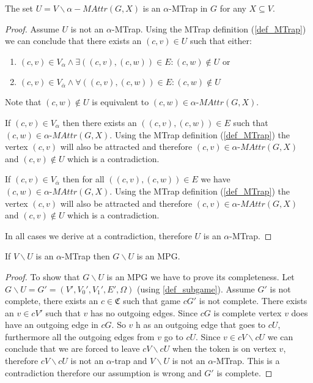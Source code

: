 \begin{lemma}
	\label{lem_MPG_attr_exc_trap}
	The set $U=V\backslash \alpha{-}MAttr(G,X)$ is an $\alpha$-MTrap in $G$ for any $X \subseteq V$.
	\begin{proof}
		Assume $U$ is not an $\alpha$-MTrap. Using the MTrap definition (\ref{def_MTrap}) we can conclude that there exists an $(c,v) \in U$ such that either:
		\begin{enumerate}
			\item $(c,v) \in V_\alpha \wedge \exists((c,v),(c,w)) \in E: (c,w) \notin U$ or
			\item $(c,v) \in V_{\overline{\alpha}} \wedge \forall((c,v),(c,w)) \in E: (c,w) \notin U$
		\end{enumerate}
	Note that $(c,w) \notin U$ is equivalent to $(c,w) \in \alpha\textit{-MAttr}(G,X)$.
	
	If $(c,v) \in V_\alpha$ then there exists an $((c,v),(c,w)) \in E$ such that $(c,w) \in \alpha\textit{-MAttr}(G,X)$. Using the MTrap definition (\ref{def_MTrap}) the vertex $(c,v)$ will also be attracted and therefore $(c,v) \in \alpha\textit{-MAttr}(G,X)$ and $(c,v) \notin U$ which is a contradiction.
	
	If $(c,v) \in V_{\overline{\alpha}}$ then for all $((c,v),(c,w)) \in E$ we have $(c,w) \in \alpha\textit{-MAttr}(G,X)$. Using the MTrap definition (\ref{def_MTrap}) the vertex $(c,v)$ will also be attracted and therefore $(c,v) \in \alpha\textit{-MAttr}(G,X)$ and $(c,v) \notin U$ which is a contradiction.
	
	In all cases we derive at a contradiction, therefore $U$ is an $\alpha$-MTrap.
	\end{proof}
\end{lemma}
\begin{lemma}
	\label{lem_MPG_sub_trap_is_MPG}
	If $V\backslash U$ is an $\alpha$-MTrap then $G\backslash U$ is an MPG.
	\begin{proof}
		To show that $G\backslash U$ is an MPG we have to prove its completeness. Let $G\backslash U = G' = (V',V_0',V_1',E', \Omega)$ (using \ref{def_subgame}). Assume $G'$ is not complete, there exists an $c \in \mathfrak{C}$ such that game $cG'$ is not complete. There exists an $v \in cV'$ such that $v$ has no outgoing edges. Since $cG$ is complete vertex $v$ does have an outgoing edge in $cG$. So $v$ h as an outgoing edge that goes to $cU$, furthermore all the outgoing edges from $v$ go to $cU$. Since $v \in cV\backslash cU$ we can conclude that we are forced to leave $cV \backslash cU$ when the token is on vertex $v$, therefore $cV \backslash cU$ is not an $\alpha$-trap and $V \backslash U$ is not an $\alpha$-MTrap. This is a contradiction therefore our assumption is wrong and $G'$ is complete.
	\end{proof}
\end{lemma}
